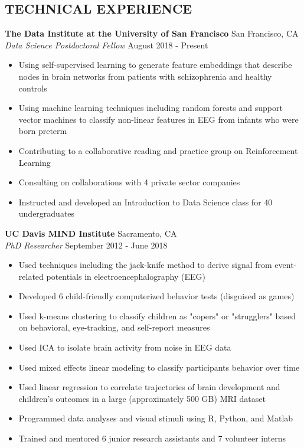 \documentclass[line,margin,10pt]{res}
\begin{document}
\begin{resume}
\section{TECHNICAL EXPERIENCE}

\textbf{The Data Institute at the University of San Francisco} \hfill San Francisco, CA \\
{\sl Data Science Postdoctoral Fellow} \hfill August 2018 - Present
\begin{itemize} \itemsep -2pt
\item Using self-supervised learning to generate feature embeddings that describe nodes in brain networks from patients with schizophrenia and healthy controls
\item Using machine learning techniques including random forests and support vector machines to classify non-linear features in EEG from infants who were born preterm
\item Contributing to a collaborative reading and practice group on Reinforcement Learning
\item Consulting on collaborations with 4 private sector companies
\item Instructed and developed an Introduction to Data Science class for 40 undergraduates
\end{itemize}


\textbf{UC Davis MIND Institute} \hfill Sacramento, CA \\
{\sl PhD Researcher} \hfill September 2012 - June 2018
\begin{itemize} \itemsep -2pt
\item Used techniques including the jack-knife method to derive signal from event-related potentials in electroencephalography (EEG)
\item Developed 6 child-friendly computerized behavior tests (disguised as games)
\item Used k-means clustering to classify children as "copers" or "strugglers" based on behavioral, eye-tracking, and self-report measures
\item Used ICA to isolate brain activity from noise in EEG data
\item Used mixed effects linear modeling to classify participants behavior over time
\item Used linear regression to correlate trajectories of brain development and children's outcomes in a large (approximately 500 GB) MRI dataset
\item Programmed data analyses and visual stimuli using R, Python, and Matlab
\item Trained and mentored 6 junior research assistants and 7 volunteer interns
\end{itemize}


\end{resume}
\end{document}

